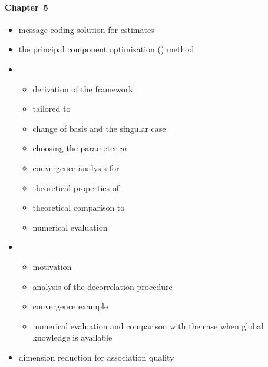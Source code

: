\paragraph{Chapter~5}
\begin{itemize}
	\item message coding solution for \abbrDR estimates
	\item the principal component optimization (\abbrPCO) method
	\item \abbrGEVO
	\begin{itemize}
		\item derivation of the \abbrGEVO framework
		\item \abbrGEVO tailored to \abbrBSC
		\item change of basis and the singular case
		\item choosing the parameter $m$
		\item convergence analysis for \GEVOCI
		\item theoretical properties of \GEVOLE
		\item theoretical comparison to \abbrPCO
		\item numerical evaluation
	\end{itemize}
	\item \abbrCIE
	\begin{itemize}
		\item motivation
		\item analysis of the decorrelation procedure
		\item convergence example
		\item numerical evaluation and comparison with the case when global knowledge is available
	\end{itemize}
	\item dimension reduction for association quality
\end{itemize}






